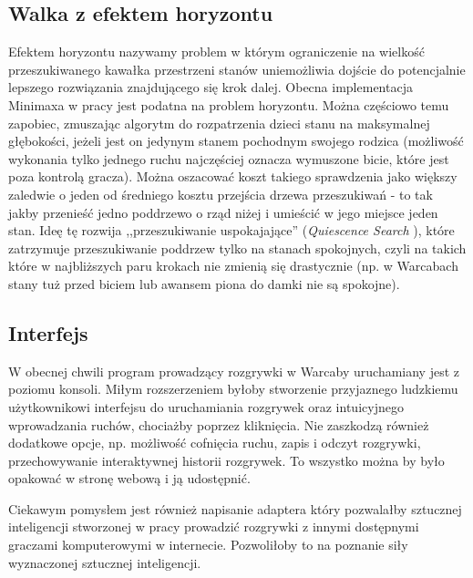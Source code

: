 \subsection{Walka z efektem horyzontu}

Efektem horyzontu nazywamy problem w którym ograniczenie na wielkość przeszukiwanego kawałka przestrzeni stanów uniemożliwia dojście do potencjalnie lepszego rozwiązania znajdującego się krok dalej. Obecna implementacja Minimaxa w pracy jest podatna na problem horyzontu. Można częściowo temu zapobiec, zmuszając algorytm do rozpatrzenia dzieci stanu na maksymalnej głębokości, jeżeli jest on jedynym stanem pochodnym swojego rodzica (możliwość wykonania tylko jednego ruchu najczęściej oznacza wymuszone bicie, które jest poza kontrolą gracza). Można oszacować koszt takiego sprawdzenia jako większy zaledwie o jeden od średniego kosztu przejścia drzewa przeszukiwań - to tak jakby przenieść jedno poddrzewo o rząd niżej i umieścić w jego miejsce jeden stan. Ideę tę rozwija ,,przeszukiwanie uspokajające'' (\textit{Quiescence Search} \cite{QSearch}), które zatrzymuje przeszukiwanie poddrzew tylko na stanach spokojnych, czyli na takich które w najbliższych paru krokach nie zmienią się drastycznie (np. w Warcabach stany tuż przed biciem lub awansem piona do damki nie są spokojne).

\subsection{Interfejs}

W obecnej chwili program prowadzący rozgrywki w Warcaby uruchamiany jest z poziomu konsoli. Miłym rozszerzeniem byłoby stworzenie przyjaznego ludzkiemu użytkownikowi interfejsu do uruchamiania rozgrywek oraz intuicyjnego wprowadzania ruchów, chociażby poprzez kliknięcia. Nie zaszkodzą również dodatkowe opcje, np. możliwość cofnięcia ruchu, zapis i odczyt rozgrywki, przechowywanie interaktywnej historii rozgrywek. To wszystko można by było opakować w stronę webową i ją udostępnić.

Ciekawym pomysłem jest również napisanie adaptera który pozwalałby sztucznej inteligencji stworzonej w pracy prowadzić rozgrywki z innymi dostępnymi graczami komputerowymi w internecie. Pozwoliłoby to na poznanie siły wyznaczonej sztucznej inteligencji.




